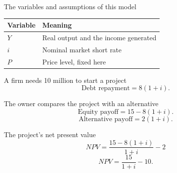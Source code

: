 \documentclass[12pt,aspectratio=169]{beamer}
\renewcommand{\loanrate}{i}
\begin{document}

\begin{frame}{The variables and assumptions of this model}
\begin{center}\begin{tabular}{@{}ll@{}}\toprule \textbf{Variable} & \textbf{Meaning}\\\midrule $Y$ & Real output and the income generated\\[2mm]
$i$ & Nominal market short rate\\[2mm]
$P$ & Price level, fixed here\\\bottomrule\end{tabular}\end{center}
\end{frame}


\begin{frame}{A firm needs 10 million to start a project}
\[\text{Debt repayment}=8(1+\loanrate).\]
\end{frame}


\begin{frame}{The owner compares the project with an alternative}
\[\text{Equity payoff}=15-8(1+\loanrate).\]\[\text{Alternative payoff}=2(1+\loanrate).\]
\end{frame}


\begin{frame}{The project's net present value}
\[NPV=\frac{15-8(1+\loanrate)}{1+\loanrate}-2\]\[\boxed{NPV=\frac{15}{1+\loanrate}-10.}\]
\end{frame}

\end{document}

